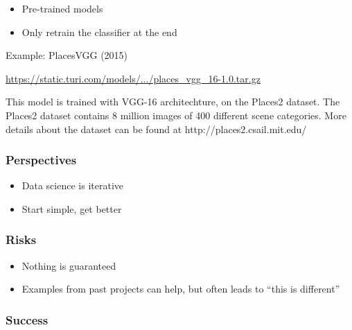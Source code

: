 
\begin{frame}
  \begin{itemize}
  \item Pre-trained models
  \item Only retrain the classifier at the end
  \end{itemize}
\end{frame}

\begin{frame}
  Example: PlacesVGG (2015)

  \vspace{5mm}
  

  \url{https://static.turi.com/models/.../places_vgg_16-1.0.tar.gz}
  
  This model is trained with VGG-16 architechture, on the Places2
  dataset. The Places2 dataset contains 8 million images of 400
  different scene categories. More details about the dataset can be
  found at http://places2.csail.mit.edu/

  \vfill
\end{frame}


\begin{frame}[t]
  \frametitle{Perspectives}

  \vspace{1cm}
  \begin{itemize}
  \item Data science is iterative
  \item Start simple, get better
  \end{itemize}

\end{frame}

\begin{frame}[t]
  \frametitle{Risks}

  \vspace{1cm}
  \begin{itemize}
  \item Nothing is guaranteed
  \item Examples from past projects can help, but often leads to ``this is different''
  \end{itemize}
\end{frame}

\begin{frame}[t]
  \frametitle{Success}
  \vspace{2cm}
  \centerline{}
  \vspace{1cm}
\end{frame}


